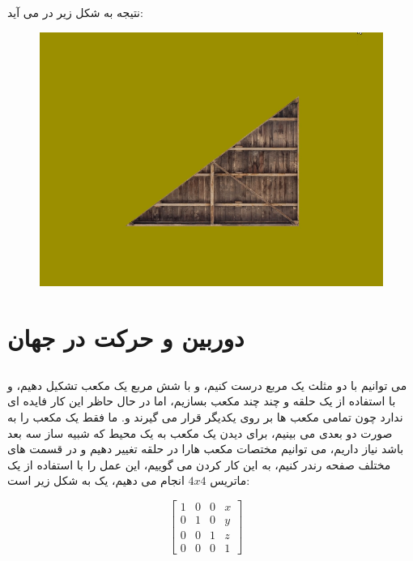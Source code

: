 \documentclass[a4paper, 12pt]{book}
\begin{document}
    نتیجه به شکل زیر در می آید:

\vspace*{0.3cm}
\begin{figure}[ht]
    \centering
    \href{https://github.com/devprofile98/shm}{
        \includegraphics[width=13cm]{images/texturedtriangle.png}
    }
    \caption{}
    \label{fig:my_label}
\end{figure}
\newpage



\vspace*{6.0cm}
\section*{\huge{دوربین و حرکت در جهان}}
\vspace*{0.6cm}
\subsection*{}
\noindent
\normalsize

    می توانیم با دو مثلث یک مربع درست کنیم، و با شش مربع یک مکعب تشکیل دهیم، و با استفاده از یک حلقه و چند  چند مکعب بسازیم، اما در حال حاظر این کار فایده ای ندارد چون تمامی مکعب ها بر روی یکدیگر قرار می گیرند و. ما فقط یک مکعب را به صورت دو بعدی می بینیم، برای دیدن یک مکعب به یک محیط که شبیه ساز سه بعد باشد نیاز داریم، می توانیم مختصات مکعب هارا در حلقه تغییر دهیم و در قسمت های مختلف صفحه رندر کنیم، به این کار  کردن می گوییم، این عمل را با استفاده از یک ماتریس
    $4x4$
    انجام می دهیم، یک  به شکل زیر است:\par
\begin{center}
\setlength\arraycolsep{5pt}
\renewcommand{\arraystretch}{0.75}
	$$
	\begin{bmatrix}
	1 & 0 & 0 & x \\
	0 & 1 & 0 & y \\
	0 & 0 & 1 & z \\
    0 & 0 & 0 & 1
	\end{bmatrix}
	\quad
	$$
\end{center}
\end{document}
